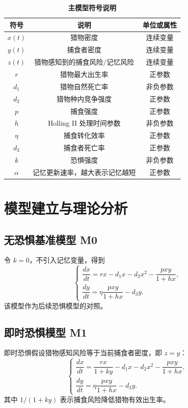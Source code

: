 \documentclass{article}
\begin{document}
\begin{table}[H]
    \caption{\textbf{主模型符号说明}}
    \centering
    \begin{tabular}{ccc}
    \toprule
    符号 & 说明 & 单位或属性 \\
    \midrule
    $x(t)$ & 猎物密度 & 连续变量 \\
    $y(t)$ & 捕食者密度 & 连续变量 \\
    $z(t)$ & 猎物感知到的捕食风险/记忆风险 & 连续变量 \\
    $r$ & 猎物最大出生率 & 正参数 \\
    $d_1$ & 猎物自然死亡率 & 非负参数 \\
    $d_2$ & 猎物种内竞争强度 & 正参数 \\
    $p$ & 捕食强度 & 正参数 \\
    $h$ & Holling II 处理时间参数 & 非负参数 \\
    $\eta$ & 捕食转化效率 & 正参数 \\
    $d_3$ & 捕食者死亡率 & 正参数 \\
    $k$ & 恐惧强度 & 非负参数 \\
    $\alpha$ & 记忆更新速率，越大表示记忆越短 & 正参数 \\
    \bottomrule
    \end{tabular}
\end{table}

\section{模型建立与理论分析}

\subsection{无恐惧基准模型 M0}
令 $k=0$，不引入记忆变量，得到
\begin{equation}
\begin{cases}
\dfrac{dx}{dt}=rx-d_1x-d_2x^2-\dfrac{pxy}{1+hx},\\[6pt]
\dfrac{dy}{dt}=\eta\dfrac{pxy}{1+hx}-d_3y.
\end{cases}
\end{equation}
该模型作为后续恐惧模型的对照。

\subsection{即时恐惧模型 M1}
即时恐惧假设猎物感知风险等于当前捕食者密度，即 $z=y$：
\begin{equation}
\begin{cases}
\dfrac{dx}{dt}=\dfrac{rx}{1+ky}-d_1x-d_2x^2-\dfrac{pxy}{1+hx},\\[6pt]
\dfrac{dy}{dt}=\eta\dfrac{pxy}{1+hx}-d_3y.
\end{cases}
\end{equation}
其中 $1/(1+ky)$ 表示捕食风险降低猎物有效出生率。
\end{document}
